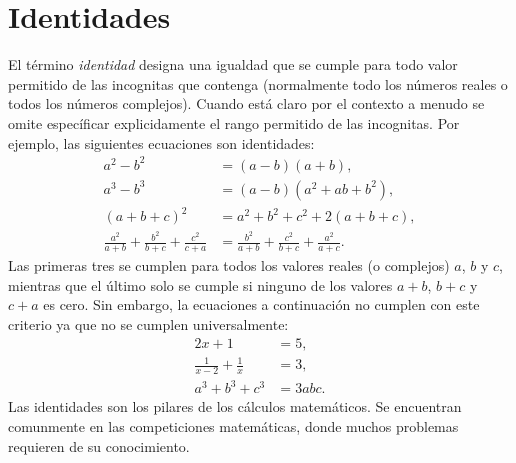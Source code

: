 \section{Identidades}

El término \textit{identidad} designa una igualdad que se cumple para todo valor permitido de las incognitas que contenga (normalmente todo los números reales o todos los números complejos).
Cuando está claro por el contexto a menudo se omite específicar explicidamente el rango permitido de las incognitas.
Por ejemplo, las siguientes ecuaciones son identidades:
\begin{align*}
    a^2 - b^2 &= (a - b)(a + b),\\
    a^3 - b^3 &= (a - b)(a^2 + ab + b^2),\\
    (a + b + c)^2 &= a^2 + b^2 + c^2 + 2(a + b + c),\\
    \frac{a^2}{a + b} + \frac{b^2}{b + c} + \frac{c^2}{c + a} &= \frac{b^2}{a + b} + \frac{c^2}{b + c} + \frac{a^2}{a + c}.
\end{align*}
Las primeras tres se cumplen para todos los valores reales (o complejos) $a$, $b$ y $c$, mientras que el último solo se cumple si ninguno de los valores $a + b$, $b + c$ y $c + a$ es cero.
Sin embargo, la ecuaciones a continuación no cumplen con este criterio ya que no se cumplen universalmente:
\begin{align*}
    2x + 1 &= 5,\\
    \frac{1}{x - 2} + \frac{1}{x} &= 3,\\
    a^3 + b^3 + c^3 &= 3abc.
\end{align*}
Las identidades son los pilares de los cálculos matemáticos.
Se encuentran comunmente en las competiciones matemáticas, donde muchos problemas requieren de su conocimiento.

